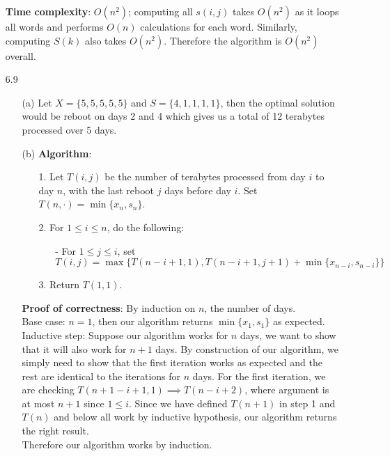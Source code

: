 \documentclass{article}
\begin{document}
\begin{itemize}
          \textbf{Time complexity}: $O(n^2)$; computing all $s(i,j)$ takes $O(n^2)$ as it loops all words and performs $O(n)$ calculations for each word. Similarly, computing $S(k)$ also takes $O(n^2)$. Therefore the algorithm is $O(n^2)$ overall.
    \item [6.9]
          \begin{itemize}
              \item [(a)] Let $X=\{5,5,5,5,5\}$ and $S=\{4,1,1,1,1\}$, then the optimal solution would be reboot on days 2 and 4 which gives us a total of 12 terabytes processed over 5 days.
              \item [(b)]
                    \textbf{Algorithm}:
                    \begin{itemize}
                        \item [1.] Let $T(i,j)$ be the number of terabytes processed from day $i$ to day $n$, with the last reboot $j$ days before day $i$. Set $T(n,\cdot)=\min\{x_n,s_n\}$.
                        \item [2.] For $1\leq i\leq n$, do the following:
                              \begin{itemize}
                                  \item [-] For $1\leq j\leq i$, set $T(i,j)=\max\{T(n-i+1,1),T(n-i+1,j+1)+\min\{x_{n-i},s_{n-i}\}\}$
                              \end{itemize}
                        \item [3.] Return $T(1,1)$.
                    \end{itemize}
                    \textbf{Proof of correctness}: By induction on $n$, the number of days.\\
                    Base case: $n=1$, then our algorithm returns $\min\{x_1,s_1\}$ as expected.\\
                    Inductive step: Suppose our algorithm works for $n$ days, we want to show that it will also work for $n+1$ days. By construction of our algorithm, we simply need to show that the first iteration works as expected and the rest are identical to the iterations for $n$ days. For the first iteration, we are checking $T(n+1-i+1,1)\implies T(n-i+2)$, where argument is at most $n+1$ since $1\leq i$. Since we have defined $T(n+1)$ in step 1 and $T(n)$ and below all work by inductive hypothesis, our algorithm returns the right result.\\
                    Therefore our algorithm works by induction.\\

\end{itemize}
\end{itemize}
\end{document}
